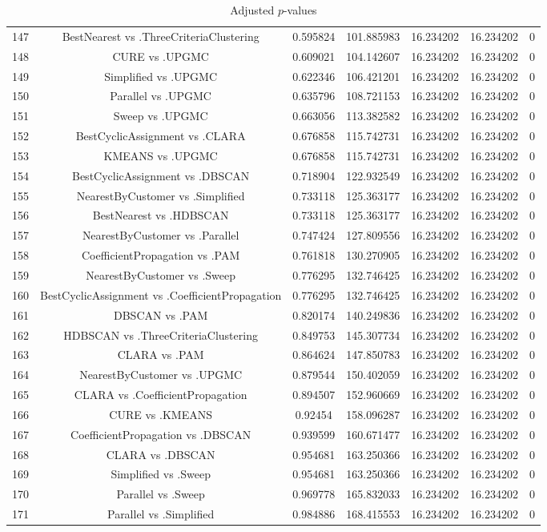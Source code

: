 \documentclass[a4paper,10pt]{article}
\begin{document}
\begin{landscape}
\begin{table}[!htp]
\begin{tabular}{ccccccc}
147&BestNearest vs .ThreeCriteriaClustering&0.595824&101.885983&16.234202&16.234202&0\\
148&CURE vs .UPGMC&0.609021&104.142607&16.234202&16.234202&0\\
149&Simplified vs .UPGMC&0.622346&106.421201&16.234202&16.234202&0\\
150&Parallel vs .UPGMC&0.635796&108.721153&16.234202&16.234202&0\\
151&Sweep vs .UPGMC&0.663056&113.382582&16.234202&16.234202&0\\
152&BestCyclicAssignment vs .CLARA&0.676858&115.742731&16.234202&16.234202&0\\
153&KMEANS vs .UPGMC&0.676858&115.742731&16.234202&16.234202&0\\
154&BestCyclicAssignment vs .DBSCAN&0.718904&122.932549&16.234202&16.234202&0\\
155&NearestByCustomer vs .Simplified&0.733118&125.363177&16.234202&16.234202&0\\
156&BestNearest vs .HDBSCAN&0.733118&125.363177&16.234202&16.234202&0\\
157&NearestByCustomer vs .Parallel&0.747424&127.809556&16.234202&16.234202&0\\
158&CoefficientPropagation vs .PAM&0.761818&130.270905&16.234202&16.234202&0\\
159&NearestByCustomer vs .Sweep&0.776295&132.746425&16.234202&16.234202&0\\
160&BestCyclicAssignment vs .CoefficientPropagation&0.776295&132.746425&16.234202&16.234202&0\\
161&DBSCAN vs .PAM&0.820174&140.249836&16.234202&16.234202&0\\
162&HDBSCAN vs .ThreeCriteriaClustering&0.849753&145.307734&16.234202&16.234202&0\\
163&CLARA vs .PAM&0.864624&147.850783&16.234202&16.234202&0\\
164&NearestByCustomer vs .UPGMC&0.879544&150.402059&16.234202&16.234202&0\\
165&CLARA vs .CoefficientPropagation&0.894507&152.960669&16.234202&16.234202&0\\
166&CURE vs .KMEANS&0.92454&158.096287&16.234202&16.234202&0\\
167&CoefficientPropagation vs .DBSCAN&0.939599&160.671477&16.234202&16.234202&0\\
168&CLARA vs .DBSCAN&0.954681&163.250366&16.234202&16.234202&0\\
169&Simplified vs .Sweep&0.954681&163.250366&16.234202&16.234202&0\\
170&Parallel vs .Sweep&0.969778&165.832033&16.234202&16.234202&0\\
171&Parallel vs .Simplified&0.984886&168.415553&16.234202&16.234202&0\\
\hline
\end{tabular}
\caption{Adjusted $p$-values}
\end{table}

\end{landscape}
\end{document}
